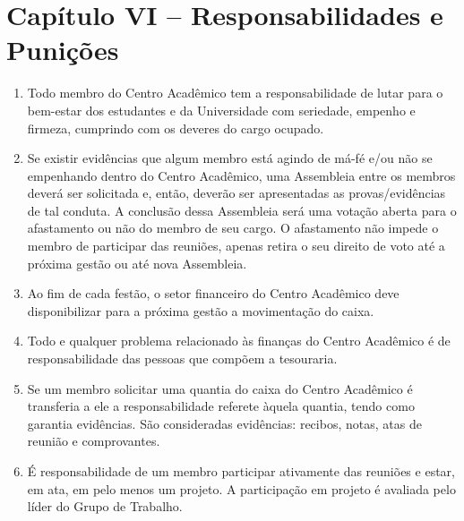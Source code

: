 \documentclass[12pt]{article}
\begin{document}
\section{Capítulo VI -- Responsabilidades e Punições}
\begin{enumerate}[label=\S\,\arabic*$^\circ$]
    \item Todo membro do Centro Acadêmico tem a responsabilidade de lutar para
        o bem-estar dos estudantes e da Universidade com seriedade, empenho e
        firmeza, cumprindo com os deveres do cargo ocupado.
    \item Se existir evidências que algum membro está agindo de má-fé e/ou não
        se empenhando dentro do Centro Acadêmico, uma Assembleia entre os
        membros deverá ser solicitada e, então, deverão ser apresentadas as
        provas/evidências de tal conduta. A conclusão dessa Assembleia será uma
        votação aberta para o afastamento ou não do membro de seu cargo. O
        afastamento não impede o membro de participar das reuniões, apenas
        retira o seu direito de voto até a próxima gestão ou até nova
        Assembleia.
    \item Ao fim de cada festão, o setor financeiro do Centro Acadêmico deve
        disponibilizar para a próxima gestão a movimentação do caixa.
    \item Todo e qualquer problema relacionado às finanças do Centro Acadêmico
        é de responsabilidade das pessoas que compõem a tesouraria.
    \item Se um membro solicitar uma quantia do caixa do Centro Acadêmico é
        transferia a ele a responsabilidade referete àquela quantia, tendo como
        garantia evidências.
        \subitem São consideradas evidências: recibos, notas, atas de reunião e
        comprovantes.
    \item É responsabilidade de um membro participar ativamente das reuniões e
        estar, em ata, em pelo menos um projeto. A participação em projeto é
        avaliada pelo líder do Grupo de Trabalho.
\end{enumerate}
\end{document}
